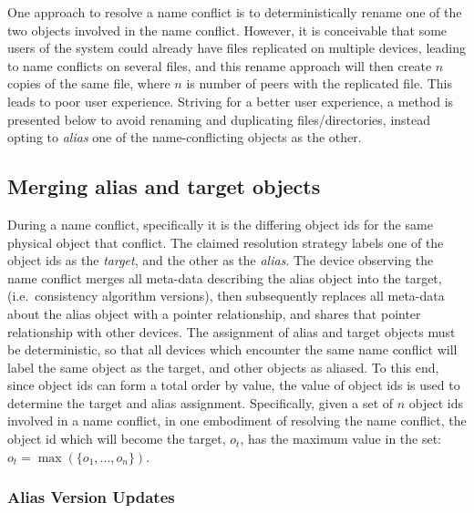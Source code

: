 One approach to resolve a name conflict is to deterministically rename one of
the two objects involved in the name conflict. However, it is conceivable
that some users of the system could already have files replicated on multiple
devices, leading to name conflicts on several files, and this rename
approach will then create $n$ copies of the same file, where $n$ is
number of peers with the replicated file. This leads to poor user experience.
Striving for a better user experience, a method is presented below to avoid
renaming and duplicating files/directories, instead opting to {\em alias} one of
the name-conflicting objects as the other.


\subsection*{Merging alias and target objects}

During a name conflict, specifically it is the differing object ids for the same
physical object that conflict. The claimed resolution strategy labels one of the
object ids as the {\em target}, and the other as the {\em alias}. The device
observing the name conflict merges all meta-data describing the alias object
into the target, (i.e.~consistency algorithm versions), then subsequently
replaces all meta-data about the alias object with a pointer relationship, and
shares that pointer relationship with other devices. The assignment of alias and
target objects must be deterministic, so that all devices which encounter the
same name conflict will label the same object as the target, and other objects
as aliased. To this end, since object ids can form a total order by value, the
value of object ids is used to determine the target and alias assignment.
Specifically, given a set of $n$ object ids involved in a name conflict, in one
embodiment of resolving the name conflict, the object id which will become the
target, $o_t$, has the maximum value in the set: $o_t = \max\left(\{o_1, \ldots,
o_n\}\right)$.

\subsubsection*{Alias Version Updates}

